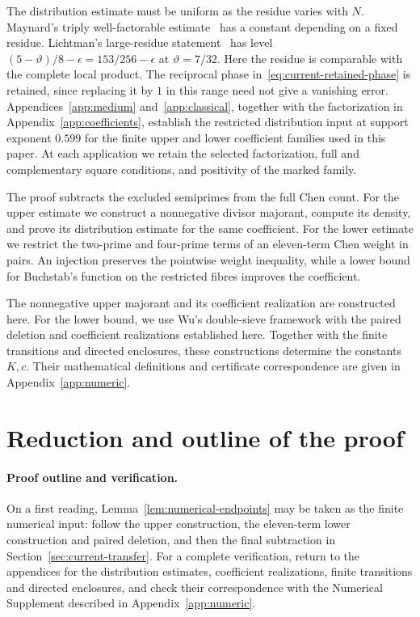 The distribution estimate must be uniform as the residue varies with
$N$. Maynard's triply well-factorable estimate~\cite[Definition~2 and
Theorem~1.1]{MaynardII} has a constant depending on a fixed residue.
Lichtman's large-residue statement~\cite[Theorem~1.7]{Lichtman} has
level $(5-\vartheta)/8-\epsilon=153/256-\epsilon$ at
$\vartheta=7/32$. Here the residue is comparable with the complete
local product. The reciprocal phase
in~\eqref{eq:current-retained-phase} is retained, since replacing it
by $1$ in this range need not give a vanishing error.
Appendices~\ref{app:medium} and~\ref{app:classical}, together with the
factorization in Appendix~\ref{app:coefficients}, establish the
restricted distribution input at support exponent $0.599$ for the
finite upper and lower coefficient families used in this paper.
At each application we retain the selected factorization, full and
complementary square conditions, and positivity of the marked family.

The proof subtracts the excluded semiprimes from the full Chen count.
For the upper estimate we construct a nonnegative divisor majorant,
compute its density, and prove its distribution estimate for the same
coefficient. For the lower estimate we restrict the two-prime and
four-prime terms of an eleven-term Chen weight in pairs. An injection
preserves the pointwise weight inequality, while a lower bound for
Buchstab's function on the restricted fibres improves the coefficient.

The nonnegative upper majorant and its coefficient realization are
constructed here. For the lower bound, we use Wu's double-sieve framework
with the paired deletion and coefficient realizations established here.
Together with the finite transitions and directed enclosures, these
constructions determine the constants $K,c$. Their mathematical
definitions and certificate correspondence are given in
Appendix~\ref{app:numeric}.

\section{Reduction and outline of the proof}
\label{sec:outline}

\paragraph{Proof outline and verification.}
On a first reading, Lemma~\ref{lem:numerical-endpoints} may be taken as
the finite numerical input: follow the upper construction, the eleven-term
lower construction and paired deletion, and then the final subtraction in
Section~\ref{sec:current-transfer}. For a complete verification, return to
the appendices for the distribution estimates, coefficient realizations,
finite transitions and directed enclosures, and check their correspondence
with the Numerical Supplement described in Appendix~\ref{app:numeric}.

